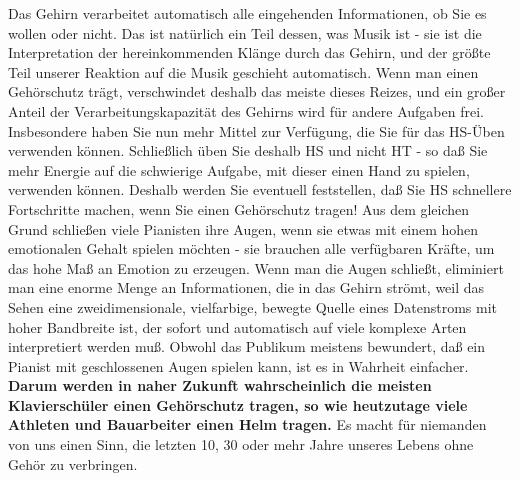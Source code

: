 Das Gehirn verarbeitet automatisch alle eingehenden Informationen, ob Sie es wollen oder nicht.
Das ist natürlich ein Teil dessen, was Musik ist - sie ist die Interpretation der hereinkommenden Klänge durch das Gehirn, und der größte Teil unserer Reaktion auf die Musik geschieht automatisch.
Wenn man einen Gehörschutz trägt, verschwindet deshalb das meiste dieses Reizes, und ein großer Anteil der Verarbeitungskapazität des Gehirns wird für andere Aufgaben frei.
Insbesondere haben Sie nun mehr Mittel zur Verfügung, die Sie für das HS-Üben verwenden können.
Schließlich üben Sie deshalb HS und nicht HT - so daß Sie mehr Energie auf die schwierige Aufgabe, mit dieser einen Hand zu spielen, verwenden können.
Deshalb werden Sie eventuell feststellen, daß Sie HS schnellere Fortschritte machen, wenn Sie einen Gehörschutz tragen!
Aus dem gleichen Grund schließen viele Pianisten ihre Augen, wenn sie etwas mit einem hohen emotionalen Gehalt spielen möchten - sie brauchen alle verfügbaren Kräfte, um das hohe Maß an Emotion zu erzeugen.
Wenn man die Augen schließt, eliminiert man eine enorme Menge an Informationen, die in das Gehirn strömt, weil das Sehen eine zweidimensionale, vielfarbige, bewegte Quelle eines Datenstroms mit hoher Bandbreite ist, der sofort und automatisch auf viele komplexe Arten interpretiert werden muß.
Obwohl das Publikum meistens bewundert, daß ein Pianist mit geschlossenen Augen spielen kann, ist es in Wahrheit einfacher.
\textbf{Darum werden in naher Zukunft wahrscheinlich die meisten Klavierschüler einen Gehörschutz tragen, so wie heutzutage viele Athleten und Bauarbeiter einen Helm tragen.}
Es macht für niemanden von uns einen Sinn, die letzten 10, 30 oder mehr Jahre unseres Lebens ohne Gehör zu verbringen.

